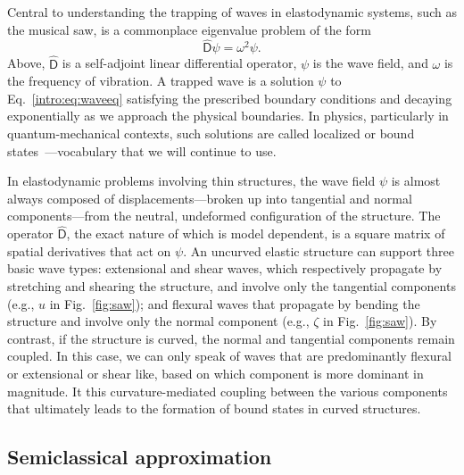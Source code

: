 Central to understanding the trapping of waves in elastodynamic systems, such as the musical saw, is a commonplace eigenvalue problem of the form
%
\begin{equation}
  \widehat{\mathsf{D}}\psi = \omega^{2}\psi.
  \label{intro:eq:waveeq}
\end{equation}
%
Above, $\widehat{\mathsf{D}}$ is a self-adjoint linear differential operator, $\psi$ is the wave field, and $\omega$ is the frequency of vibration.
A trapped wave is a solution $\psi$ to Eq.~\eqref{intro:eq:waveeq} satisfying the prescribed boundary conditions and decaying exponentially as we approach the physical boundaries.
In physics, particularly in quantum-mechanical contexts, such solutions are called localized or bound states~\cite{ravendranadhan1989,ravendranadhan1993,ravendranadhan1994}---vocabulary that we will continue to use.

In elastodynamic problems involving thin structures, the wave field $\psi$ is almost always composed of displacements---broken up into tangential and normal components---from the neutral, undeformed configuration of the structure.
The operator $\widehat{\mathsf{D}}$, the exact nature of which is model dependent, is a square matrix of spatial derivatives that act on $\psi$.
An uncurved elastic structure can support three basic wave types: extensional and shear waves, which respectively propagate by stretching and shearing the structure, and involve only the tangential components (e.g., $u$ in Fig.~\ref{fig:saw}); and flexural waves that propagate by bending the structure and involve only the normal component (e.g., $\zeta$ in Fig.~\ref{fig:saw}).
By contrast, if the structure is curved, the normal and tangential components remain coupled.
In this case, we can only speak of waves that are predominantly flexural or extensional or shear like, based on which component is more dominant in magnitude.
It this curvature-mediated coupling between the various components that ultimately leads to the formation of bound states in curved structures.

\subsection{Semiclassical approximation}

